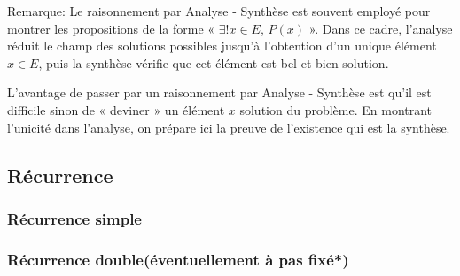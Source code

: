 \documentclass{article}
\begin{document}
Remarque: Le raisonnement par Analyse - Synthèse est souvent employé pour montrer les propositions de la forme « \( \exists!x \in E \), \( P(x) \) ». Dans ce cadre, l'analyse réduit le champ des solutions possibles jusqu'à l'obtention d'un unique élément \( x \in E \), puis la synthèse vérifie que cet élément est bel et bien solution.

L'avantage de passer par un raisonnement par Analyse - Synthèse est qu'il est difficile sinon de « deviner » un élément \( x \) solution du problème. En montrant l'unicité dans l'analyse, on prépare ici la preuve de l'existence qui est la synthèse.


\begin{tcolorbox}[colback=cyan!5!white,colframe=cyan!75!black,title=Exercice]


\end{tcolorbox}

\subsection{Récurrence}



\subsubsection{Récurrence simple}

\begin{tcolorbox}[colback=green!5!white,colframe=green!75!black,title=Point méthode 4.13]


\end{tcolorbox}


\begin{tcolorbox}[colback=cyan!5!white,colframe=cyan!75!black,title=Exercice]


\end{tcolorbox}

\subsubsection{Récurrence double(éventuellement à pas fixé*)}

\begin{tcolorbox}[colback=green!5!white,colframe=green!75!black,title=Point méthode 4.14]


\end{tcolorbox}


\begin{tcolorbox}[colback=cyan!5!white,colframe=cyan!75!black,title=Exercice]


\end{tcolorbox}
\end{document}

